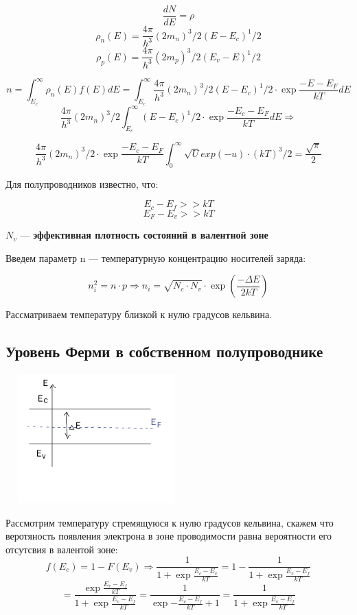 \documentclass[../main.tex]{subfiles}
\begin{document}
\[ \frac{dN}{dE} = \rho\]
\[\rho_n(E) = \frac{4 \pi}{h^3}(2m_n)^3/2 (E-E_c)^1/2\]
\[\rho_p(E) = \frac{4 \pi}{h^3}(2m_p)^3/2 (E_v-E)^1/2\]

\[n = \int_{E_c}^{\infty} \rho_n(E) f(E) dE = \int_{E_c}^{\infty} \frac{4 \pi}{h^3}(2m_n)^3/2 (E-E_c)^1/2 \cdot \exp{\frac{- E - E_F}{kT}} dE\]
\[\frac{4 \pi}{h^3}(2m_n)^3/2 \int_{E_c}^{\infty} (E-E_c)^1/2 \cdot \exp{\frac{- E_c - E_F}{kT}} d E \Rightarrow \]

\[\frac{4 \pi}{h^3}(2m_n)^3/2 \cdot\exp{\frac{- E_c - E_F}{kT}} \int_{0}^{\infty} \sqrt{U}exp(-u) \cdot (kT)^3/2 = \frac{\sqrt{\pi}}{2} \]

Для полупроводников известно, что: 

\[E_c - E_f >> kT\]
\[E_F - E_v >> kT\]

$N_v$ --- \textbf{эффективная плотность состояний в валентной зоне}

Введем параметр n --- температурную концентрацию носителей заряда:

\[
\boxed{
n_i^2 = n \cdot p \Rightarrow 
n_i = \sqrt{N_c \cdot N_v} \cdot 
\exp\!\left(\frac{- \Delta E}{2 k T}\right)
}
\]

Рассматриваем температуру близкой к нулю градусов кельвина.

\subsection{Уровень Ферми в собственном полупроводнике}
\begin{center}
    \includegraphics[height=5cm, width=7cm]{../img/kvantovy24.png}
\end{center}
Рассмотрим температуру стремящуюся к нулю градусов кельвина, скажем что веротяность появления электрона в зоне проводимости равна вероятности его отсутсвия в валентой зоне:
\[f(E_c) = 1 - F(E_v) \Rightarrow \frac{1}{1+ \exp{\frac{E_c - E_v}{kT}}} = 1 - \frac{1}{1+ \exp{\frac{E_v - E_f}{kT}}} \]
\[ = \frac{\exp{\frac{E_v- E_f}{kT}}}{1 + \exp{\frac{E_v - E_f}{kT}}} = \frac{1}{\exp{- \frac{E_v - E_f}{kT}} +1 } = \frac{1}{1+\exp{\frac{E_v - E_f}{kT}}}\]
\end{document}
